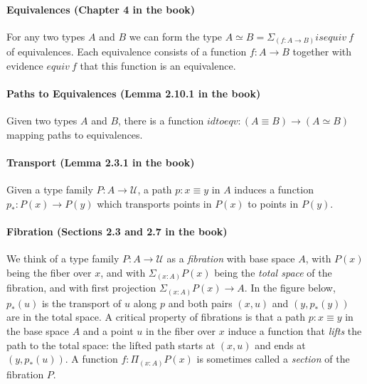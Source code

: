 \documentclass{entcs}
\begin{document}
\paragraph*{Equivalences (Chapter 4 in the book)} For any two types $A$ and $B$
we can form the type $A \simeq B = \Sigma_{(f : A \to B)} \mathit{isequiv}~f$ of
equivalences. Each equivalence consists of a function $f : A \to B$ together
with evidence $\mathit{equiv}~f$ that this function is an equivalence.

\paragraph*{Paths to Equivalences (Lemma 2.10.1 in the book)} Given two types
$A$ and $B$, there is a function
$\mathit{idtoeqv} : (A \equiv B) \to (A \simeq B)$ mapping paths to
equivalences.

\paragraph*{Transport (Lemma 2.3.1 in the book)} Given a type family
$P : A \to \mathcal{U}$, a path $p : x \equiv y$ in $A$ induces a function
$p_* : P(x) \to P(y)$ which transports points in $P(x)$ to points in $P(y)$.

\paragraph*{Fibration (Sections 2.3 and 2.7 in the book)} We think of a type
family $P : A \to \mathcal{U}$ as a \emph{fibration} with base space $A$, with
$P(x)$ being the fiber over $x$, and with $\Sigma_{(x:A)} P(x)$ being the
\emph{total space} of the fibration, and with first projection
$\Sigma_{(x:A)} P(x) \to A$. In the figure below, $p_*(u)$ is the transport of
$u$ along $p$ and both pairs $(x,u)$ and $(y,p_*(y))$ are in the total space. A
critical property of fibrations is that a path $p : x \equiv y$ in the base
space $A$ and a point $u$ in the fiber over $x$ induce a function that
\emph{lifts} the path to the total space: the lifted path starts at $(x,u)$ and
ends at $(y,p_*(u))$. A function $f : \Pi_{(x:A)} P(x)$ is sometimes called a
\emph{section} of the fibration $P$.
\end{document}
